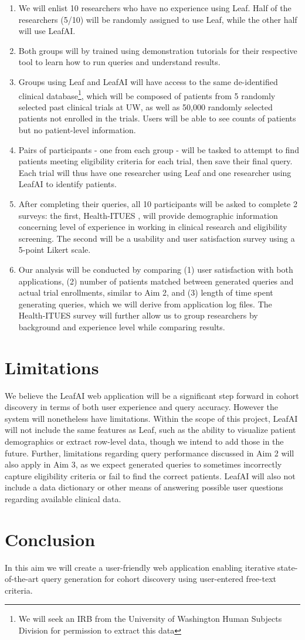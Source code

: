 \documentclass[../main.tex]{subfiles}
\begin{document}
\begin{enumerate}
    \item We will enlist 10 researchers who have no experience using Leaf. Half of the researchers (5/10) will be randomly assigned to use Leaf, while the other half will use LeafAI.
    \item Both groups will by trained using demonstration tutorials for their respective tool to learn how to run queries and understand results.
    \item Groups using Leaf and LeafAI will have access to the same de-identified clinical database\footnote{We will seek an IRB from the University of Washington Human Subjects Division for permission to extract this data}, which will be composed of patients from 5 randomly selected past clinical trials at UW, as well as 50,000 randomly selected patients not enrolled in the trials. Users will be able to see counts of patients but no patient-level information.
    \item Pairs of participants - one from each group - will be tasked to attempt to find patients meeting eligibility criteria for each trial, then save their final query. Each trial will thus have one researcher using Leaf and one researcher using LeafAI to identify patients.
    \item After completing their queries, all 10 participants will be asked to complete 2 surveys: the first, Health-ITUES \cite{yen2010development}, will provide demographic information concerning level of experience in working in clinical research and eligibility screening. The second will be a usability and user satisfaction survey using a 5-point Likert scale.
    \item Our analysis will be conducted by comparing (1) user satisfaction with both applications, (2) number of patients matched between generated queries and actual trial enrollments, similar to Aim 2, and (3) length of time spent generating queries, which we will derive from application log files. The Health-ITUES survey will further allow us to group researchers by background and experience level while comparing results.
\end{enumerate}

\section{Limitations}

We believe the LeafAI web application will be a significant step forward in cohort discovery in terms of both user experience and query accuracy. However the system will nonetheless have limitations. Within the scope of this project, LeafAI will not include the same features as Leaf, such as the ability to visualize patient demographics or extract row-level data, though we intend to add those in the future. Further, limitations regarding query performance discussed in Aim 2 will also apply in Aim 3, as we expect generated queries to sometimes incorrectly capture eligibility criteria or fail to find the correct patients. LeafAI will also not include a data dictionary or other means of answering possible user questions regarding available clinical data.

\section{Conclusion}

In this aim we will create a user-friendly web application enabling iterative state-of-the-art query generation for cohort discovery using user-entered free-text criteria.
\end{document}
